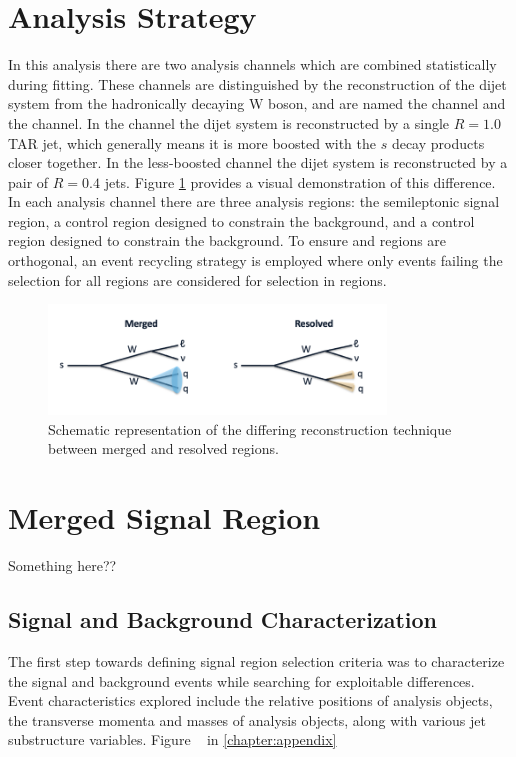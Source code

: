 \section{Analysis Strategy}
\label{section:ana_strat}
In this analysis there are two analysis channels which are combined statistically during fitting. These channels are distinguished by the reconstruction of the dijet system from the hadronically decaying W boson, and are named the \merged channel and the \resolved channel. In the \merged channel the dijet system is reconstructed by a single $R=1.0$ TAR jet, which generally means it is more boosted with the $s$ decay products closer together. In the less-boosted \resolved channel the dijet system is reconstructed by a pair of $R=0.4$ jets. Figure \ref{fig:mgd_res} provides a visual demonstration of this difference. In each analysis channel there are three analysis regions: the semileptonic signal region, a control region designed to constrain the \ttbar background, and a control region designed to constrain the \wjets background. To ensure \merged and \resolved regions are orthogonal, an event recycling strategy is employed where only events failing the selection for all \merged regions are considered for selection in \resolved regions.

\begin{figure}[h!]
    \centering
    \includegraphics[width=0.8\textwidth]{Figures/4/mgd_res.png}
    \caption{Schematic representation of the differing reconstruction technique between merged and resolved regions.}
    \label{fig:mgd_res}
\end{figure}

\section{Merged Signal Region}
Something here??
\label{section:sr_merged}
\subsection{Signal and Background Characterization}
The first step towards defining signal region selection criteria was to characterize the signal and background events while searching for exploitable differences. Event characteristics explored include the relative positions of analysis objects, the transverse momenta and masses of analysis objects, along with various jet substructure variables. Figure ~ in \ref{chapter:appendix}

